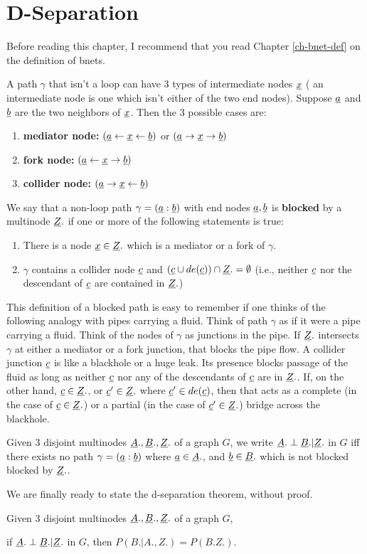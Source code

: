 \chapter{D-Separation}
\label{chap-dsep}
Before reading this chapter,
I  recommend
that you
read
Chapter \ref{ch-bnet-def}
on the definition of bnets.


A path $\gamma$ that
isn't a loop can have 
3 types of intermediate nodes ${\underline{x}}$ (
an intermediate node is one  which 
isn't either
of the two end nodes).
Suppose ${\underline{a}}$ and ${\underline{b}}$
are the two neighbors of ${\underline{x}}$. Then
the 3 possible cases are:
\begin{enumerate}
\item {\bf mediator node:}
$({\underline{a}}\leftarrow{\underline{x}}\leftarrow {\underline{b}})$
or
$({\underline{a}}\rightarrow{\underline{x}}\rightarrow {\underline{b}})$
\item {\bf fork node:}
$({\underline{a}}\leftarrow{\underline{x}}\rightarrow {\underline{b}})$
\item {\bf collider node:}
$({\underline{a}}\rightarrow{\underline{x}}\leftarrow {\underline{b}})$
\end{enumerate}

We say that a non-loop path 
$\gamma=
({\underline{a}}:{\underline{b}})$ with
end nodes ${\underline{a}}, {\underline{b}}$
is {\bf blocked} by a multinode ${\underline{Z}}.$
if one or more 
of the following
statements is true:

\begin{enumerate}
\item 
There is a node ${\underline{x}}\in {\underline{Z}}.$
which is a mediator 
or a fork of $\gamma$.
\item
$\gamma$ contains a collider
node ${\underline{c}}$
and 
$({\underline{c}}\cup de({\underline{c}}))\cap{\underline{Z}}.=\emptyset$
(i.e., neither 
${\underline{c}}$ nor the descendant of ${\underline{c}}$
are contained in ${\underline{Z}}.$)
\end{enumerate}

This definition of a blocked 
path is easy to remember
if one thinks 
of the following analogy
with pipes carrying a fluid.
Think of path
$\gamma$ as if it
were a pipe
carrying a fluid.
Think of
the nodes 
of $\gamma$ as junctions in the pipe.
If ${\underline{Z}}.$
intersects $\gamma$
at either a mediator
or a fork junction,
that blocks the pipe flow.
A collider junction ${\underline{c}}$
is like a blackhole 
or a huge leak.
Its presence
blocks passage
of the fluid
as long
as neither
${\underline{c}}$
nor any of
the descendants 
of ${\underline{c}}$
are in ${\underline{Z}}.$.
If,
on the 
other hand,
${\underline{c}}\in{\underline{Z}}.$,
or ${\underline{c}}'\in {\underline{Z}}.$
where ${\underline{c}}'\in de({\underline{c}})$,
then
that acts
as a complete
(in the case of ${\underline{c}}\in{\underline{Z}}.$)
or a partial 
(in the case of ${\underline{c}}'\in{\underline{Z}}.$)
bridge across the blackhole.

Given 3 
disjoint multinodes 
${\underline{A}}., {\underline{B}}., {\underline{Z}}.$
of a graph $G$,
we write 
${\underline{A}}.\perp {\underline{B}}.|{\underline{Z}}.$
in $G$
iff there exists 
no path
$\gamma=({\underline{a}}:{\underline{b}})$
where ${\underline{a}}\in {\underline{A}}.$,
and
${\underline{b}}\in{\underline{B}}.$
which is not 
blocked blocked by ${\underline{Z}}.$.

We are finally ready
to state the d-separation
theorem, without proof.

\begin{claim}
Given 3 disjoint
multinodes
${\underline{A}}., {\underline{B}}., {\underline{Z}}.$
of a graph $G$,

if 
${\underline{A}}.\perp {\underline{B}}.|{\underline{Z}}.$
in $G$, then
$P(B.|A., Z.)=P(B.Z.)$.

\end{claim}


